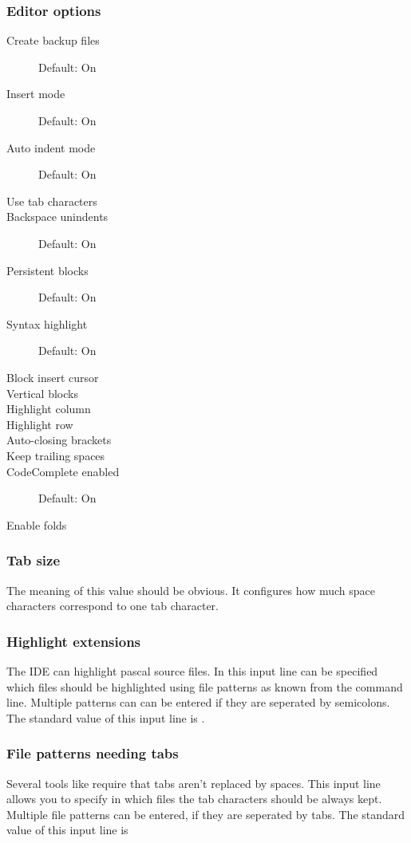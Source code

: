 \subsubsection{Editor options}
\begin{description}
\item [Create backup files]  Default: On  %
\item [Insert mode]  Default: On  %
\item [Auto indent mode] Default: On  %
\item [Use tab characters]  %
\item [Backspace unindents] Default: On %
\item [Persistent blocks]  Default: On %
\item [Syntax highlight]  Default: On %
\item [Block insert cursor]  %
\item [Vertical blocks] %
\item [Highlight column] %
\item [Highlight row]  %
\item [Auto-closing brackets]  %
\item [Keep trailing spaces]  %
\item [CodeComplete enabled] Default: On %
\item [Enable folds]
\end{description}

\subsubsection{Tab size}
The meaning of this value should be obvious. It configures how
much space characters correspond to one tab character.

\subsubsection{Highlight extensions}
The IDE can highlight pascal source files. In this input line
can be specified which files should be highlighted using file
patterns as known from the command line. Multiple patterns can
can be entered if they are seperated by semicolons. The standard
value of this input line is .

\subsubsection{File patterns needing tabs}
Several tools like  require that tabs aren't replaced
by spaces. This input line allows you to specify in which files
the tab characters should be always kept. Multiple file patterns
can be entered, if they are seperated by tabs. The standard
value of this input line is 

